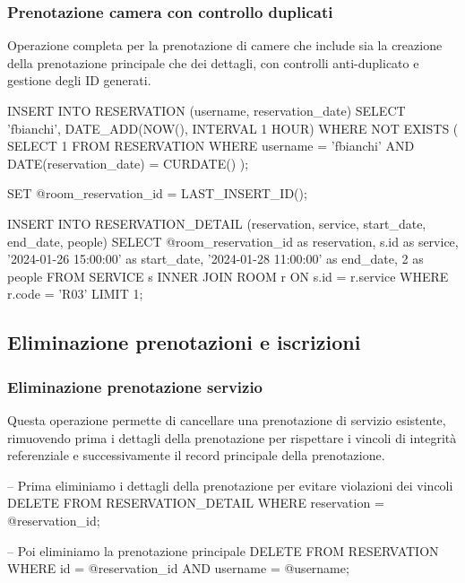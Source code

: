 \documentclass[a4paper,12pt]{report}
\begin{document}
\subsubsection{Prenotazione camera con controllo duplicati} 
Operazione completa per la prenotazione di camere che include sia la creazione della prenotazione principale che dei dettagli, con controlli anti-duplicato e gestione degli ID generati.

\begin{sqlcode}[caption={Query per prenotazione camera}]
INSERT INTO RESERVATION (username, reservation_date)
SELECT 'fbianchi', DATE_ADD(NOW(), INTERVAL 1 HOUR)
WHERE NOT EXISTS (
    SELECT 1 FROM RESERVATION 
    WHERE username = 'fbianchi' 
    AND DATE(reservation_date) = CURDATE()
);

SET @room_reservation_id = LAST_INSERT_ID();

INSERT INTO RESERVATION_DETAIL (reservation, service, start_date, end_date, people)
SELECT 
    @room_reservation_id as reservation,
    s.id as service,
    '2024-01-26 15:00:00' as start_date,
    '2024-01-28 11:00:00' as end_date,
    2 as people
FROM SERVICE s
INNER JOIN ROOM r ON s.id = r.service
WHERE r.code = 'R03'
LIMIT 1;
\end{sqlcode}

\subsection{Eliminazione prenotazioni e iscrizioni}

\subsubsection{Eliminazione prenotazione servizio}
Questa operazione permette di cancellare una prenotazione di servizio esistente, rimuovendo prima i dettagli della prenotazione per rispettare i vincoli di integrità referenziale e successivamente il record principale della prenotazione.

\begin{sqlcode}[caption={Query per eliminazione prenotazione servizio}]
-- Prima eliminiamo i dettagli della prenotazione per evitare violazioni dei vincoli
DELETE FROM RESERVATION_DETAIL 
WHERE reservation = @reservation_id;

-- Poi eliminiamo la prenotazione principale
DELETE FROM RESERVATION 
WHERE id = @reservation_id 
  AND username = @username;
\end{sqlcode}
\end{document}
